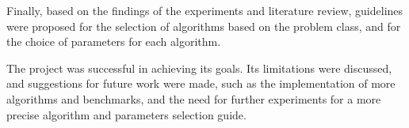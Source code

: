 Finally, based on the findings of the experiments and literature review, guidelines were proposed for the selection of algorithms based on the problem class, and for the choice of
parameters for each algorithm.

The project was successful in achieving its goals. Its limitations were discussed, and suggestions for future work were made, such as the implementation of more algorithms and benchmarks,
and the need for further experiments for a more precise algorithm and parameters selection guide.
